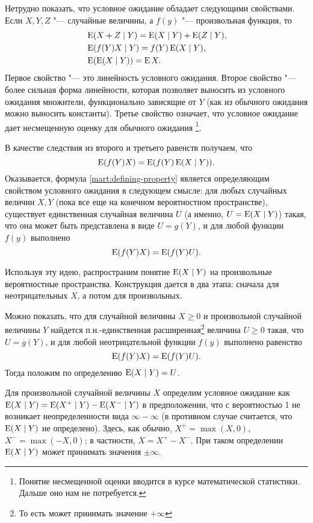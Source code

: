 Нетрудно показать, что условное ожидание обладает следующими свойствами.
Если $X,Y,Z$ "--- случайные величины, а $f(y)$ "--- произвольная функция, то 
\begin{align*}
&\operatorname{E}(X+Z \mid Y) = \operatorname{E}(X\mid Y) + \operatorname{E}(Z\mid Y),\\
&\operatorname{E}(f(Y)X \mid Y) = f(Y)\operatorname{E}(X\mid Y),\\
&\operatorname{E}(\operatorname{E}(X\mid Y)) = \operatorname{E} X.
\end{align*}
Первое свойство "--- это линейность условного ожидания.
Второе свойство "--- более сильная форма линейности, которая позволяет выносить из условного ожидания множители, функционально зависящие от $Y$ (как из обычного ожидания можно выносить константы).
Третье свойство означает, что условное ожидание дает несмещенную оценку для обычного ожидания%
\footnote{Понятие несмещенной оценки вводится в курсе математической статистики.
Дальше оно нам не потребуется.}.

В качестве следствия из второго и третьего равенств получаем, что 
\begin{equation}
\label{mart:defining-property}
\operatorname{E}(f(Y)X) = \operatorname{E}(f(Y)\operatorname{E}(X\mid Y)).
\end{equation}
Оказывается, формула \eqref{mart:defining-property} является определяющим свойством условного ожидания в следующем смысле: для любых случайных величин $X,Y$ (пока все еще на конечном вероятностном пространстве), существует единственная случайная величина $U$ (а именно, $U=\operatorname{E}(X\mid Y)$) такая, что она может быть представлена в виде $U=g(Y)$, и для любой функции $f(y)$ выполнено
\[
\operatorname{E}(f(Y)X) = \operatorname{E}(f(Y)U).
\]

Используя эту идею, распространим понятие $\operatorname{E}(X\mid Y)$ на произвольные вероятностные пространства.
Конструкция дается в два этапа: сначала для неотрицательных $X$, а потом для произвольных.

Можно показать, что для случайной величины $X\ge 0$ и произвольной случайной величины $Y$ найдется п.н.-единственная расширенная\footnote{То есть может принимать значение $+\infty$} величина $U\ge0$ такая, что $U=g(Y)$, и для любой неотрицательной функции $f(y)$ выполнено равенство
\[
\operatorname{E}(f(Y)X) = \operatorname{E}(f(Y)U).
\]
Тогда положим по определению $\operatorname{E}(X\mid Y) = U$.

Для произвольной случайной величины $X$ определим условное ожидание как $\operatorname{E}(X\mid Y) = \operatorname{E}(X^+\mid Y) - \operatorname{E}(X^-\mid Y)$ в предположении, что с вероятностью 1 не возникает неопределенности вида $\infty-\infty$ (в противном случае считается, что $\operatorname{E}(X\mid Y)$ не определено).
Здесь, как обычно, $X^+ = \max(X,0)$, $X^- = \max(-X,0)$; в частности, $X=X^+-X^-$. При таком определении $\operatorname{E}(X\mid Y)$ может принимать значения $\pm\infty$.


